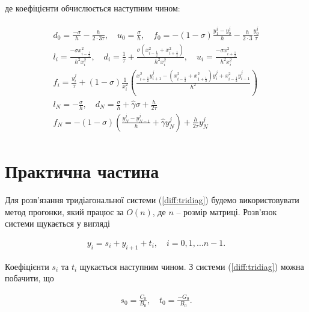 де коефіцієнти обчислюється наступним чином:

\begin{align} \label{diff:tridiag}
\begin{split}
d_0 = \frac{-\sigma}{h} - \frac{h}{2 \cdot 3\tau}, \quad u_0 = \frac{\sigma}{h}, \quad f_0 = -(1-\sigma)\frac{y_1^j - y_0^j}{h} - \frac{h}{2 \cdot 3} \frac{y_0^j}{\tau} \\
l_i = \frac{-\sigma x_{i-\frac{1}{2}}^2}{h^2 x_i^2}, \quad d_i = \frac{1}{\tau} + \frac{\sigma \left( x_{i-\frac{1}{2}}^2 +x_{i+\frac{1}{2}}^2 \right)}{h^2 x_i^2}, \quad u_i = \frac{-\sigma x_{i+\frac{1}{2}}^2}{h^2 x_i^2}\\
f_i =\frac{y_i^j}{\tau} + (1-\sigma)\frac{1}{x_i^2} \left( \frac{x_{i+\frac{1}{2}}^2 y_{i+1}^j - \left( x_{i-\frac{1}{2}}^2 + x_{1+\frac{1}{2}}^2 \right)y_i^j + x_{i-\frac{1}{2}}^2 y_{i-1}^j }{h^2}\right)\\
l_N = -\frac{\sigma}{h}, \quad d_N = \frac{\sigma}{h} + \hat{\gamma}\sigma + \frac{h}{2\tau}\\f_N = -(1-\sigma)\left( \frac{y_N^j - y_{N-1}^j}{h} + \hat{\gamma}y_N^j\right) + \frac{h}{2\tau}y_N^j
\end{split}
\end{align}


\section{Практична частина}

Для розв'язання тридіагональної системи (\ref{diff:tridiag}) будемо використовувати метод прогонки, який працює за \(O(n)\), де \( n \) -- розмір матриці. Розв'язок системи щукається у вигляді

\begin{equation}
\begin{multlined} \label{diff:solve_tridiag}
y_i = s_i + y_{i+1} + t_i, \quad i = 0, 1, \dots n-1.
\end{multlined}
\end{equation}

Коефіцієнти \(s_i\) та \(t_i\) щукається наступним чином. З системи (\ref{diff:tridiag}) можна побачити, що

\begin{equation}
\begin{multlined} 
s_0 = \frac{C_0}{B_0}, \quad t_0 = \frac{-G_0}{B_0}.
\end{multlined}
\end{equation}

